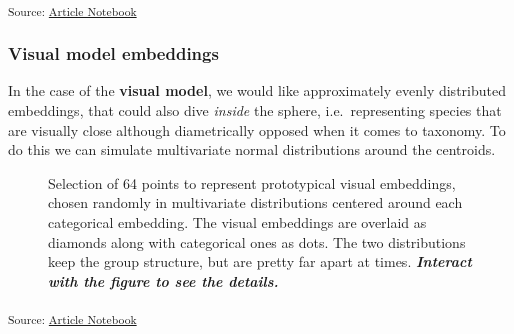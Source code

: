 \documentclass[
  authoryear]{elsarticle}
\begin{document}
\textsubscript{Source:
\href{https://m-delem.github.io/2499-similarity-manuscript/index.qmd.html}{Article
Notebook}}

\subsubsection{Visual model embeddings}\label{visual-model-embeddings}

In the case of the \textbf{visual model}, we would like approximately
evenly distributed embeddings, that could also dive \emph{inside} the
sphere, i.e.~representing species that are visually close although
diametrically opposed when it comes to taxonomy. To do this we can
simulate multivariate normal distributions around the centroids.

\label{cell-fig-visual-embeddings}
\begin{figure}[H]


\caption{\label{fig-visual-embeddings}Selection of 64 points to
represent prototypical visual embeddings, chosen randomly in
multivariate distributions centered around each categorical embedding.
The visual embeddings are overlaid as diamonds along with categorical
ones as dots. The two distributions keep the group structure, but are
pretty far apart at times. \textbf{\emph{Interact with the figure to see
the details.}}}

\end{figure}%

\textsubscript{Source:
\href{https://m-delem.github.io/2499-similarity-manuscript/index.qmd.html}{Article
Notebook}}
\end{document}
